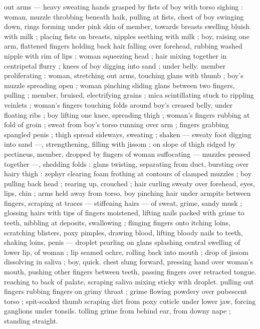 out arms --- heavy sweating hands grasped by fists of boy with torso 
sighing : woman, muzzle throbbing beneath haik, pulling at fists, 
chest of boy swinging down, rings forming under pink skin of 
member, towards breasts swelling bluish with milk ; placing fists on 
breasts, nipples seething with milk ; boy, raising one arm, flattened 
fingers holding back hair falling over forehead, rubbing washed 
nipple with rim of lips ; woman squeezing head ; hair mixing together 
in centripetal flurry ; knees of boy digging into sand ; under belly. 
member proliferating : woman, stretching out arms, touching glans 
with thumb ; boy's muzzle spreading open ; woman pinching sliding 
glans between two fingers, pulling ; member, bruised, electrifying 
grains ; mica scintillating stuck to rippling veinlets ; woman's fingers 
touching folds around boy's creased belly, under floating ribs ; boy 
lifting one knee, spreading thigh ; woman's fingers rubbing at fold of 
groin ; sweat from boy's torso running over arm ; fingers grabbing 
spangled penis ; thigh spread sideways, sweating ; shaken --- sweaty 
foot digging into sand ---, strengthening, filling with jissom ; on 
slope of thigh ridged by pectineus, member, dropped by fingers of 
woman suffocating --- muzzles pressed together ---, shedding folds 
: glans twisting, separating from duct, bursting over hairy thigh : 
zephyr clearing foam frothing at contours of clamped muzzles ; boy 
pulling back head ; rearing up, crouched ; hair curling sweaty over 
forehead, eyes, lips, chin ; arms held away from torso, boy pinching 
hair under armpits between fingers, scraping at traces --- stiffening 
hairs --- of sweat, grime, sandy musk ; glossing hairs with tips of 
fingers moistened, lifting nails packed with grime to teeth, nibbling 
at deposits, swallowing ; flinging fingers onto itching loins, 
scratching blisters, poxy pimples, drawing blood, lifting bloody nails 
to teeth, shaking loins, penis --- droplet pearling on glans splashing 
central swelling of lower lip, of woman ; lip seamed ochre, rolling 
back into mouth ; drop of jissom dissolving in saliva ; boy, quick. 
chest slung forward, pressing hand over woman's mouth, pushing 
other fingers between teeth, passing fingers over retracted tongue. 
reaching to back of palate, scraping saliva mixing sticky with droplet. 
pulling out fingers rubbing fingers on grimy throat ; grime flowing 
powdery over pubescent torso ; spit-soaked thumb scraping dirt 
from poxy cuticle under lower jaw, forcing ganglions under tonsils. 
tolling grime from behind ear, from downy nape ; standing straight. 
